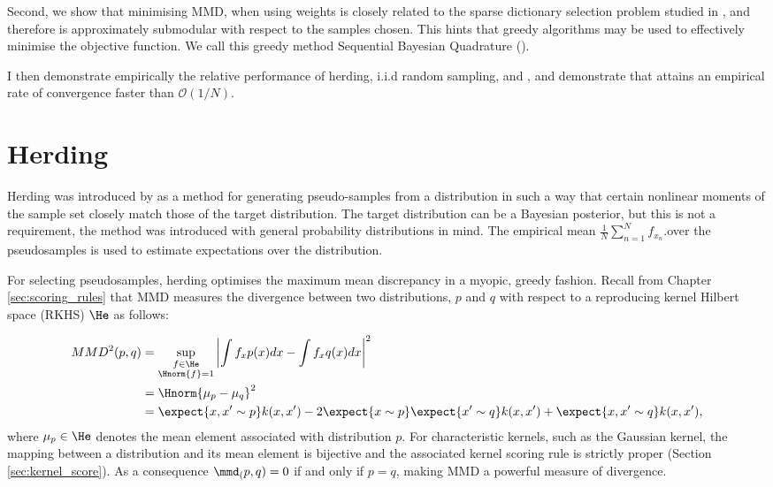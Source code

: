Second, we show that minimising MMD, when using \bq{} weights is closely related to the sparse dictionary selection problem studied in \citep{KrauseCevher10}, and therefore is approximately submodular with respect to the samples chosen. This hints that greedy algorithms may be used to effectively minimise the objective function. We call this greedy method Sequential Bayesian Quadrature (\sbq{}).

I then demonstrate empirically the relative performance of herding, i.i.d random sampling, and \sbq{}, and demonstrate that \sbq{} attains an empirical rate of convergence faster than $\mathcal{O}(1/N)$.


\section{Herding} 

Herding was introduced by \citep{welling2009herding} as a method for generating pseudo-samples from a distribution in such a way that certain nonlinear moments of the sample set closely match those of the target distribution. The target distribution can be a Bayesian posterior, but this is not a requirement, the method was introduced with general probability distributions in mind. The empirical mean  $\frac{1}{N}\sum_{n=1}^{N}f_{x_n}$.over the pseudosamples is used to estimate expectations over the distribution.

For selecting pseudosamples, herding optimises the maximum mean discrepancy \citep[MMD;\ ][]{Sriperumbudur2008} in a myopic, greedy fashion. Recall from Chapter \ref{sec:scoring_rules} that MMD measures the divergence between two distributions, $p$ and $q$ with respect to a reproducing kernel Hilbert space (RKHS) $\He$ as follows:

\begin{align}
MMD^2(p,q) &= \sup_{\substack{f\in\He\\\Hnorm{f}=1}}\left\vert\int f_x p(x) dx - \int f_x q(x) dx\right\vert^2\\
	&= \Hnorm{\mu_{p} - \mu_{q}}^2\\
	&=  \expect{x,x'\sim p} k(x,x')	- 2 \expect{x\sim p}\expect{x'\sim q} k(x,x') + \expect{x,x'\sim q} k(x,x'),
\end{align}
%
where $\mu_{p}\in\He$ denotes the mean element associated with distribution $p$. For characteristic kernels, such as the Gaussian kernel, the mapping between a distribution and its mean element is bijective and the associated kernel scoring rule is strictly proper (Section \ref{sec:kernel_score}). As a consequence $\mmd_(p,q)=0$ if and only if $p=q$, making MMD a powerful measure of divergence.

